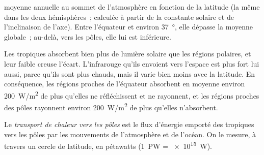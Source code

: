 \begin{omfigure}

{\small {} moyenne annuelle au sommet de l'atmosphère en fonction de
la latitude (la même dans les deux hémisphères~; calculée à partir de la
constante solaire et de l'inclinaison de l'axe). Entre l'équateur et
environ \qty{37}{\degree}, elle dépasse la moyenne globale~; au-delà, vers
les pôles, elle lui est inférieure.}
\end{omfigure}

Les tropiques absorbent bien plus de lumière solaire que les régions
polaires, et leur faible  creuse l'écart. L'infrarouge qu'ils
envoient vers l'espace est plus fort lui aussi, parce qu'ils sont plus
chauds, mais il varie bien moins avec la latitude. En conséquence, les
régions proches de l'équateur absorbent en moyenne environ
\qty{200}{W/m^2} de plus qu'elles ne réfléchissent et ne rayonnent, et les
régions proches des pôles rayonnent environ \qty{200}{W/m^2} de plus
qu'elles n'absorbent.

\begin{definition}\label{def:g10:earth-energy-budget:heat-transport}
Le \emph{transport de chaleur vers les pôles}
est le flux d'énergie emporté des tropiques vers les pôles par les
mouvements de l'atmosphère et de l'océan. On le mesure, à travers un cercle
de latitude, en pétawatts (\qty{1}{PW} = \qty{e15}{W}).
\end{definition}

